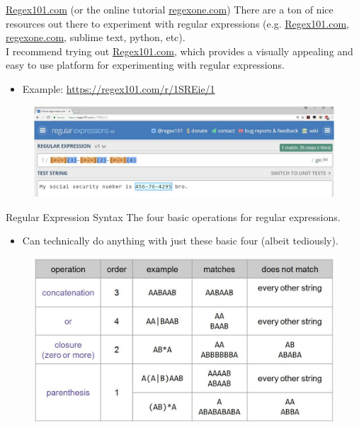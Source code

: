 \documentclass[aspectratio=169]{../latex_main/tntbeamer}  %
\begin{document}
	
	
	\begin{frame}{\url{Regex101.com} (or the online tutorial \url{regexone.com})}
	    There are a ton of nice resources out there to experiment with regular expressions (e.g. \url{Regex101.com}, \url{regexone.com}, sublime text, python, etc).\\
	    I recommend trying out \url{Regex101.com}, which provides a visually appealing and easy to use platform for experimenting with regular expressions.
        \begin{itemize}
            \item Example: \url{https://regex101.com/r/1SREie/1}
        \end{itemize}
        \begin{figure}
	        \centering
	        \includegraphics[scale=.6]{Bild9}
	    \end{figure}
	\end{frame}
	
	
	
	\begin{frame}{Regular Expression Syntax}
	   The four basic operations for regular expressions.
        \begin{itemize}
            \item Can technically do anything with just these basic four (albeit tediously). 
        \end{itemize}
        \begin{figure}
	        \centering
	        \includegraphics[scale=.35]{Bild10}
	    \end{figure}
	\end{frame}
	
\end{document}
